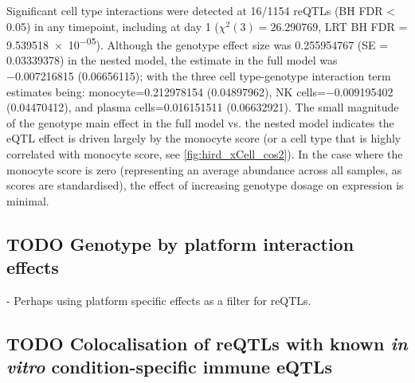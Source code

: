 Significant cell type interactions were detected at 16/1154 \glspl{reQTL} (BH FDR < 0.05) in any timepoint, including  at day 1 ($\chi^2(3) = \num{26.290769}$, \gls{LRT} BH FDR = \num{9.539518e-05}).
Although the genotype effect size was \num{0.255954767} (SE = \num{0.03339378}) in the nested model,
the estimate in the full model was \num{-0.007216815} (\num{0.06656115});
with the three cell type-genotype interaction term estimates being:
monocyte=\num{0.212978154} (\num{0.04897962}),
\gls{NK} cells=\num{-0.009195402} (\num{0.04470412}),
and plasma cells=\num{0.016151511} (\num{0.06632921}).
The small magnitude of the genotype main effect in the full model vs. the nested model indicates the \gls{eQTL} effect is driven largely by the monocyte score (or a cell type that is highly correlated with monocyte score, see \autoref{fig:hird_xCell_cos2}).
In the case where the monocyte score is zero (representing an average abundance across all samples, as scores are standardised), the effect of increasing genotype dosage on  expression is minimal.

\subsection{TODO Genotype by platform interaction effects}

%
- Perhaps using platform specific effects as a filter for reQTLs.

\subsection{TODO Colocalisation of reQTLs with known \textit{in vitro} condition-specific immune eQTLs}


